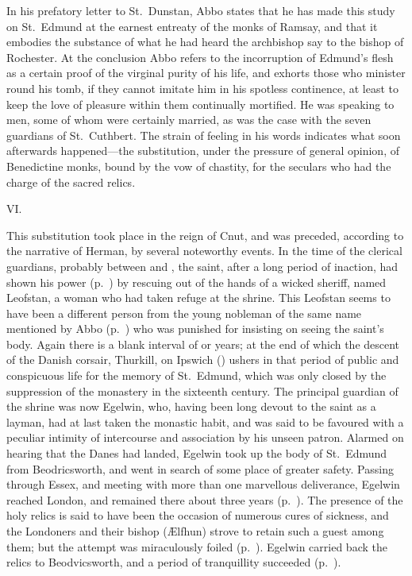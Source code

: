 \documentclass[10pt]{book}
\begin{document}
{In his prefatory letter to St.\ Dunstan, Abbo states that he has made this study on St.\ Edmund at the earnest entreaty of the monks of Ramsay, and that it embodies the substance of what he had heard the archbishop say to the bishop of Rochester. At the conclusion Abbo refers to the incorruption of Edmund's flesh as a certain proof of the virginal purity of his life, and exhorts those who minister round his tomb, if they cannot imitate him in his spotless continence, at least to keep the love of pleasure within them continually mortified. He was speaking to men, some of whom were certainly married, as was the case with the seven guardians of St.\ Cuthbert. The strain of feeling in his words indicates what soon afterwards happened---the substitution, under the pressure of general opinion, of Benedictine monks, bound by the vow of chastity, for the seculars who had the charge of the sacred relics.

\vspace{.3cm}
\begin{center}
VI.
\end{center}
\noindent This  substitution took place in the reign of Cnut, and was preceded, according to the narrative of Herman, by several noteworthy events. In the time of the clerical guardians, probably between  and , the saint, after a long period of inaction, had shown his power (p.\ ) by rescuing out of the hands of a wicked sheriff, named Leofstan, a woman who had taken refuge at the shrine. This Leofstan seems to have been a different person from the young nobleman of the same name mentioned by Abbo (p.\ ) who was punished for insisting on seeing the saint's body. Again there is a blank interval of  or  years; at the end of which the descent of the Danish corsair, Thurkill, on Ipswich () ushers in that period of public and conspicuous life for the memory of St.\ Edmund, which was only closed by the suppression of the monastery in the sixteenth century. The principal guardian of the shrine was now Egelwin, who, having been long devout to the saint as a layman, had at last taken the monastic habit, and was said to be favoured with a peculiar intimity of intercourse and association by his unseen patron. Alarmed on hearing that the Danes had landed, Egelwin took up the body of St.\ Edmund from Beodricsworth, and went in search of some place of greater safety. Passing through Essex, and meeting with more than one marvellous deliverance, Egelwin reached London, and remained there about three years (p.\ ). The presence of the holy relics is said to have been the occasion of numerous cures of sickness, and the Londoners and their bishop (\AE{}lfhun) strove to retain such a guest among them; but the attempt was miraculously foiled (p.\ ). Egelwin carried back the relics to Beodvicsworth, and a period of tranquillity succeeded (p.\ ).

}
\end{document}
